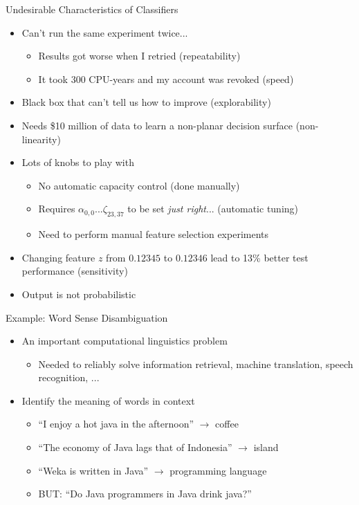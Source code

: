 \documentclass{beamer}
\begin{document}
\begin{frame}{Undesirable Characteristics of Classifiers}
\begin{itemize}
\item Can't run the same experiment twice...
  \begin{itemize}
    \item Results got worse when I retried (\alert{repeatability})
    \item It took 300 CPU-years and my account was revoked (\alert{speed})
  \end{itemize}
\item Black box that can't tell us how to improve (\alert{explorability})
\item Needs \$10 million of data to learn a non-planar decision surface (\alert{non-linearity})
\item Lots of knobs to play with
  \begin{itemize}
  \item No \alert{automatic capacity control} (done manually)
  \item Requires $\alpha_{0,0} ... \zeta_{23,37}$ to be set \emph{just right}... (\alert{automatic tuning})
  \item Need to perform manual \alert{feature selection} experiments
  \end{itemize}
\item Changing feature $z$ from $0.12345$ to $0.12346$ lead to 13\% better test performance (\alert{sensitivity})
\item Output is not \alert{probabilistic}
\end{itemize}
\end{frame}



\begin{frame}{Example: Word Sense Disambiguation}
  \begin{itemize}
  \item An important computational linguistics problem
    \begin{itemize}
      \item Needed to reliably solve information retrieval, machine translation, speech recognition, ...
    \end{itemize}
  \item Identify the meaning of words in context
    \begin{itemize}
      \item ``I enjoy a hot \alert{java} in the afternoon'' $\rightarrow$ \alert{coffee}
      \item ``The economy of \alert{Java} lags that of Indonesia'' $\rightarrow$ \alert{island}
      \item ``Weka is written in \alert{Java}'' $\rightarrow$ \alert{programming language}
      \item BUT: “Do \alert{Java} programmers in \alert{Java} drink \alert{java}?”
    \end{itemize}
  \end{itemize}
\end{frame}
\end{document}
